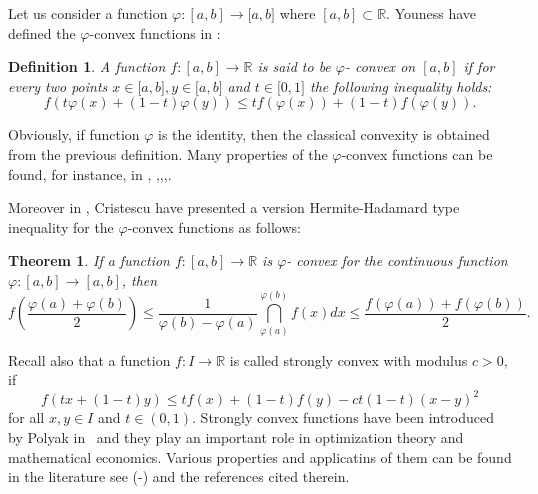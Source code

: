 \documentclass{amsart}
\newtheorem{theorem}{Theorem}
\theoremstyle{plain}
\newtheorem{definition}{Definition}
\numberwithin{equation}{section}
\begin{document}
Let us consider a function $\varphi :[a,b]\rightarrow \lbrack a,b]$ where $[a,b]\subset \mathbb{R}$. Youness have defined the $\varphi $-convex
functions in \cite{youness}:

\begin{definition}
A function $f:[a,b]\rightarrow \mathbb{R}$ is said to be $\varphi $- convex
on $[a,b]$ if for every two points $x\in \lbrack a,b],y\in \lbrack a,b]$ and 
$t\in \lbrack 0,1]$ the following inequality holds:\begin{equation*}
f(t\varphi (x)+(1-t)\varphi (y))\leq tf(\varphi (x))+(1-t)f(\varphi (y)).
\end{equation*}
\end{definition}

Obviously, if function $\varphi $ is the identity, then the classical
convexity is obtained from the previous definition. Many properties of the $\varphi $-convex functions can be found, for instance, in \cite{cristescu}, 
\cite{cristescu1},\cite{youness},\cite{sarikaya2},\cite{sarikaya3}.

Moreover in \cite{cristescu1}, Cristescu have presented a version
Hermite-Hadamard type inequality for the $\varphi $-convex functions as
follows:

\begin{theorem}
\label{zz} If a function $f:[a,b]\rightarrow \mathbb{R}$ is $\varphi $-
convex for the continuous function $\varphi :\left[ a,b\right] \rightarrow \left[ a,b\right] $, then\begin{equation}
f\left( \frac{\varphi (a)+\varphi (b)}{2}\right) \leq \frac{1}{\varphi
(b)-\varphi (a)}\dint\limits_{\varphi (a)}^{\varphi (b)}f(x)dx\leq \frac{f(\varphi (a))+f(\varphi (b))}{2}.  \label{E2}
\end{equation}
\end{theorem}

Recall also that a function $f:I\rightarrow \mathbb{R}$ is called strongly
convex with modulus $c>0,$ if\begin{equation*}
f\left( tx+\left( 1-t\right) y\right) \leq tf\left( x\right) +\left(
1-t\right) f\left( y\right) -ct(1-t)(x-y)^{2}
\end{equation*}for all $x,y\in I$ and $t\in (0,1).$ Strongly convex functions have been
introduced by Polyak in \cite{polyak}\ and they play an important role in
optimization theory and mathematical economics. Various properties and
applicatins of them can be found in the literature see (\cite{polyak}-\cite{angu}) and the references cited therein.
\end{document}

